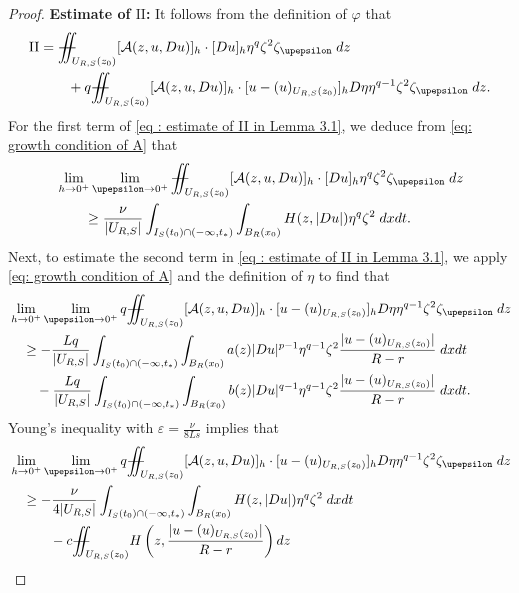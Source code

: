 \documentclass[11pt,oneside, english,reqno,twoside a4paper]{amsart}
\theoremstyle{definition}
\numberwithin{theorem}{section}
\numberwithin{equation}{section}
\newcommand{\iintss}{{\int\hspace{-0.28cm}\int}}
\newcommand{ \miints }{{\iintss\hspace{-0.56cm} -\hspace{-0.15cm}-}}
\newcommand{\miint}[1]{{\miints_{\hspace{-0.13cm}#1}}}
\begin{document}
\begin{proof}
\noindent \textbf{Estimate of $\mathrm{II}$:} It follows from the definition of $\varphi$ that
    \begin{align}\nonumber
        \mathrm{II}&=\miint{U_{R,S}(z_0)} [\mathcal{A}(z,u,Du)]_h\cdot [Du]_h\eta^q\zeta^2\zeta_\upepsilon \;dz\\ \label{eq : estimate of II in Lemma 3.1}
        &\qquad + q\miint{U_{R,S}(z_0)} [\mathcal{A}(z,u,Du)]_h\cdot [u-(u)_{U_{R, S}(z_0)}]_h D\eta \eta^{q-1}\zeta^2\zeta_\upepsilon \; dz.
    \end{align}
For the first term of \eqref{eq : estimate of II in Lemma 3.1}, we deduce from \eqref{eq: growth condition of A} that
    \begin{align*}
        &\lim_{h\rightarrow 0^+}\lim_{\upepsilon \rightarrow 0^+} \miint{U_{R,S}(z_0)} [\mathcal{A}(z,u,Du)]_h\cdot [Du]_h\eta^q\zeta^2\zeta_\upepsilon \;dz\\
        &\qquad \geq \frac{\nu}{|U_{R, S}|}\int_{I_S(t_0)\cap(-\infty,t_*)}\int_{B_R(x_0)} H(z,|Du|)\eta^q\zeta^2 \; dx dt.
    \end{align*}
    Next, to estimate the second term in \eqref{eq : estimate of II in Lemma 3.1}, we apply \eqref{eq: growth condition of A} and the definition of $\eta$ to find that 
    \begin{align*}
        &\lim_{h\rightarrow 0^+}\lim_{\upepsilon \rightarrow 0^+} q\miint{U_{R,S}(z_0)} [\mathcal{A}(z,u,Du)]_h\cdot [u-(u)_{U_{R, S}(z_0)}]_h D\eta \eta^{q-1}\zeta^2\zeta_\upepsilon \; dz\\
        &\quad \geq -\frac{Lq}{|U_{R, S}|}\int_{I_S(t_0)\cap(-\infty,t_*)}\int_{B_R(x_0)} a(z)|Du|^{p-1}\eta^{q-1}\zeta^2\frac{|u-(u)_{U_{R, S}(z_0)}|}{R-r}\; dx dt\\
        &\qquad -\frac{Lq}{|U_{R, S}|}\int_{I_S(t_0)\cap(-\infty,t_*)}\int_{B_R(x_0)} b(z)|Du|^{q-1}\eta^{q-1}\zeta^2\frac{|u-(u)_{U_{R, S}(z_0)}|}{R-r}\; dx dt.
    \end{align*}
    Young's inequality with $\varepsilon=\frac{\nu}{8Ls}$ implies that
    \begin{align*}
        &\lim_{h\rightarrow 0^+}\lim_{\upepsilon \rightarrow 0^+} q\miint{U_{R,S}(z_0)} [\mathcal{A}(z,u,Du)]_h\cdot [u-(u)_{U_{R, S}(z_0)}]_h D\eta \eta^{q-1}\zeta^2\zeta_\upepsilon\; dz\\
        &\quad \geq -\frac{\nu}{4|U_{R, S}|}\int_{I_S(t_0)\cap(-\infty,t_*)} \int_{B_R(x_0)} H(z,|Du|)\eta^q\zeta^2 \;dx dt\\
        &\quad\qquad -c\miint{U_{R,S}(z_0)} H\left(z,\frac{|u-(u)_{U_{R, S}(z_0)}|}{R-r}\right) dz

\end{align*}
\end{proof}
\end{document}
